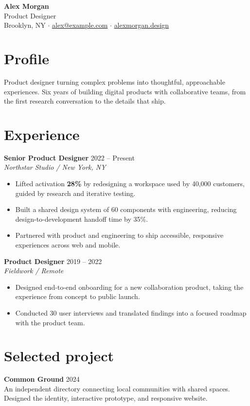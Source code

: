 \documentclass[11pt,a4paper]{article}
\begin{document}
\color{ink}

{\Huge\bfseries Alex Morgan}\\[5pt]
{\large Product Designer}\\[7pt]
\small
Brooklyn, NY \enspace $\cdot$ \enspace
\href{mailto:alex@example.com}{alex@example.com} \enspace $\cdot$ \enspace
\href{https://example.com}{alexmorgan.design}
\normalsize

\section{Profile}
Product designer turning complex problems into thoughtful, approachable
experiences. Six years of building digital products with collaborative teams,
from the first research conversation to the details that ship.

\section{Experience}
\textbf{Senior Product Designer} \hfill 2022 -- Present\\
\textit{Northstar Studio \enspace / \enspace New York, NY}
\begin{itemize}
  \item Lifted activation \textbf{28\%} by redesigning a workspace used by
        40,000 customers, guided by research and iterative testing.
  \item Built a shared design system of 60 components with engineering,
        reducing design-to-development handoff time by 35\%.
  \item Partnered with product and engineering to ship accessible,
        responsive experiences across web and mobile.
\end{itemize}

\textbf{Product Designer} \hfill 2019 -- 2022\\
\textit{Fieldwork \enspace / \enspace Remote}
\begin{itemize}
  \item Designed end-to-end onboarding for a new collaboration product,
        taking the experience from concept to public launch.
  \item Conducted 30 user interviews and translated findings into a
        focused roadmap with the product team.
\end{itemize}

\section{Selected project}
\textbf{Common Ground} \hfill 2024\\
An independent directory connecting local communities with shared spaces.
Designed the identity, interactive prototype, and responsive website.
\end{document}

